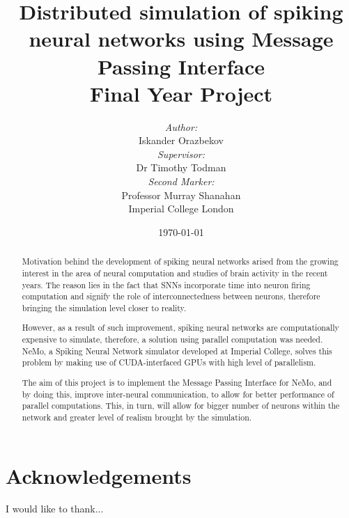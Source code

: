 \documentclass[12pt]{report}
\title{\LARGE Distributed simulation of spiking neural networks using Message Passing Interface \\ \vspace{7mm} \large Final Year Project}
\author{ \emph{Author:} \\ Iskander Orazbekov \vspace{5 mm} \\ \emph{Supervisor:} \\ Dr Timothy Todman \vspace{5 mm} \\ \emph{Second Marker:} \\ Professor Murray Shanahan \vspace{56 mm} \\ Imperial College London}
\date{\today}
\begin{document}
\maketitle

\begin{abstract}

Motivation behind the development of spiking neural networks arised from the growing interest in the area of neural 
computation and studies of brain activity in the recent years. The reason lies in the fact that SNNs incorporate time
into neuron firing computation and signify the role of interconnectedness between neurons, therefore bringing the simulation 
level closer to reality.

However, as a result of such improvement, spiking neural networks are computationally expensive to simulate, therefore, a solution 
using parallel computation was needed. NeMo, a Spiking Neural Network simulator developed at Imperial College, solves this problem 
by making use of CUDA-interfaced GPUs with high level of parallelism.

The aim of this project is to implement the Message Passing Interface for NeMo, and by doing this, improve inter-neural communication, 
to allow for better performance of parallel computations. This, in turn, will allow for bigger number of neurons within the network 
and greater level of realism brought by the simulation.

\end{abstract}

\clearpage

\chapter*{Acknowledgements}
\thispagestyle{empty}

I would like to thank...

\clearpage

\tableofcontents

\renewcommand{\chaptername}{}













\clearpage



\end{document}
